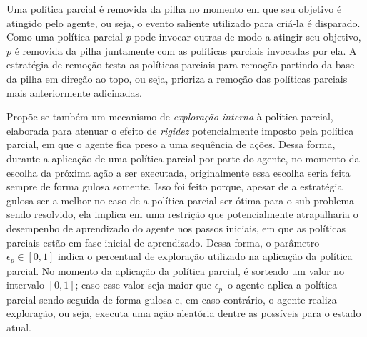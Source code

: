 \documentclass[kdmile,a4paper]{kdmile} %
\newcommand{\epS}{\epsilon_{p}}
\newcommand{\ep}{$\epS$}
\begin{document}
Uma política parcial é removida da pilha no momento em que seu
objetivo é atingido pelo agente, ou seja, o evento saliente utilizado
para criá-la é disparado.  Como uma política parcial $p$ pode invocar
outras de modo a atingir seu objetivo, $p$ é removida da pilha
juntamente com as políticas parciais invocadas por ela.  A estratégia
de remoção testa as políticas parciais para remoção partindo da base
da pilha em direção ao topo, ou seja, prioriza a remoção das políticas
parciais mais anteriormente adicinadas.

Propõe-se também um mecanismo de \emph{exploração interna} à política
parcial, elaborada para atenuar o efeito de \emph{rigidez}
potencialmente imposto pela política parcial, em que o agente fica
preso a uma sequência de ações. Dessa forma, durante a aplicação de
uma política parcial por parte do agente, no momento da escolha da
próxima ação a ser executada, originalmente essa escolha seria feita
sempre de forma gulosa somente.  Isso foi feito porque, apesar de a
estratégia gulosa ser a melhor no caso de a política parcial ser ótima
para o sub-problema sendo resolvido, ela implica em uma restrição que
potencialmente atrapalharia o desempenho de aprendizado do agente nos
passos iniciais, em que as políticas parciais estão em fase inicial de
aprendizado.  Dessa forma, o parâmetro $\epS \in [0,1]$ indica o
percentual de exploração utilizado na aplicação da política parcial.
No momento da aplicação da política parcial, é sorteado um valor no
intervalo $[0,1]$; caso esse valor seja maior que \ep\, o agente
aplica a política parcial sendo seguida de forma gulosa e, em caso
contrário, o agente realiza exploração, ou seja, executa uma ação
aleatória dentre as possíveis para o estado atual.


\end{document}
